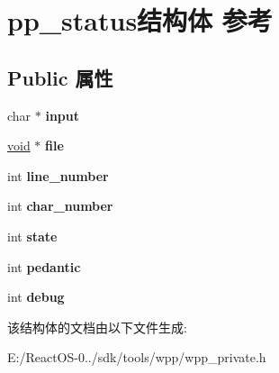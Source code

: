 \hypertarget{structpp__status}{}\section{pp\+\_\+status结构体 参考}
\label{structpp__status}
\subsection*{Public 属性}
\begin{DoxyCompactItemize}
\item 
\mbox{\label{structpp__status_a3ab5464e04dff5aaaf9570a43cb538d3}} 
char $\ast$ {\bfseries input}
\item 
\mbox{\label{structpp__status_a30ecfdca3bb05db2d224ba7e1723c170}} 
\hyperlink{interfacevoid}{void} $\ast$ {\bfseries file}
\item 
\mbox{\label{structpp__status_add1826ab63dd172c316e8143c29d3924}} 
int {\bfseries line\+\_\+number}
\item 
\mbox{\label{structpp__status_aa616c84f78fb9694255099138b7c1fb6}} 
int {\bfseries char\+\_\+number}
\item 
\mbox{\label{structpp__status_aeb561c405504c2258d0a70bd8752c8f4}} 
int {\bfseries state}
\item 
\mbox{\label{structpp__status_a329a4a11e07872cdb3cf6f0b643b30cd}} 
int {\bfseries pedantic}
\item 
\mbox{\label{structpp__status_a6f8be10451bb2076f9bab66046f22880}} 
int {\bfseries debug}
\end{DoxyCompactItemize}


该结构体的文档由以下文件生成\+:\begin{DoxyCompactItemize}
\item 
E\+:/\+React\+O\+S-\/0../sdk/tools/wpp/wpp\+\_\+private.\+h\end{DoxyCompactItemize}
